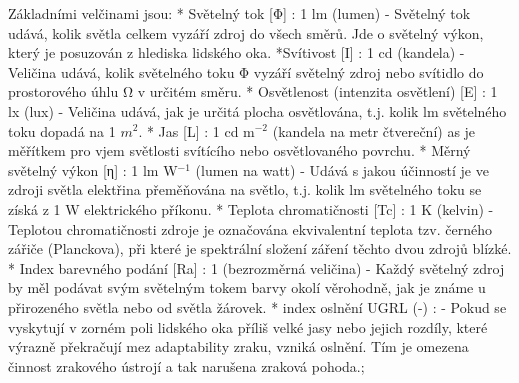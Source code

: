 \medskip
Základními velčinami jsou:
\begitems
* {\sbf Světelný tok [Φ]} : 1 lm (lumen) - Světelný tok udává, kolik světla celkem vyzáří zdroj do všech směrů.
    Jde o světelný výkon, který je posuzován z hlediska lidského oka.
*{\sbf Svítivost [I]} : 1 cd (kandela) - Veličina udává, kolik světelného toku Φ vyzáří světelný zdroj nebo svítidlo
    do prostorového úhlu Ω v určitém směru.
* {\sbf Osvětlenost (intenzita osvětlení) [E]} : 1 lx (lux) - Veličina udává, jak je určitá plocha osvětlována,
    t.j. kolik lm světelného toku dopadá na 1 $m^2$.
* {\sbf Jas [L]} : 1 cd m$^{-2}$ (kandela na metr čtvereční)
    as je měřítkem pro vjem světlosti svítícího nebo osvětlovaného povrchu.
* {\sbf Měrný světelný výkon [η]} : 1 lm W$^{-1}$ (lumen na watt) -
    Udává s jakou účinností je ve zdroji světla elektřina přeměňována na světlo, t.j. kolik
    lm světelného toku se získá z 1 W elektrického příkonu.
* {\sbf Teplota chromatičnosti [Tc]} : 1 K (kelvin) - Teplotou chromatičnosti zdroje je označována ekvivalentní
    teplota tzv. černého zářiče (Planckova), při které je spektrální složení záření těchto dvou zdrojů blízké.
* {\sbf Index barevného podání [Ra]} : 1 (bezrozměrná veličina) -
    Každý světelný zdroj by měl podávat svým světelným tokem barvy okolí věrohodně, jak je známe u přirozeného
    světla nebo od světla žárovek.
* {\sbf index oslnění UGRL (-)} : - Pokud se vyskytují v zorném poli lidského oka příliš velké jasy nebo jejich
    rozdíly, které výrazně překračují mez adaptability zraku, vzniká oslnění. Tím je omezena činnost zrakového ústrojí a
    tak narušena zraková pohoda.;
\enditems






